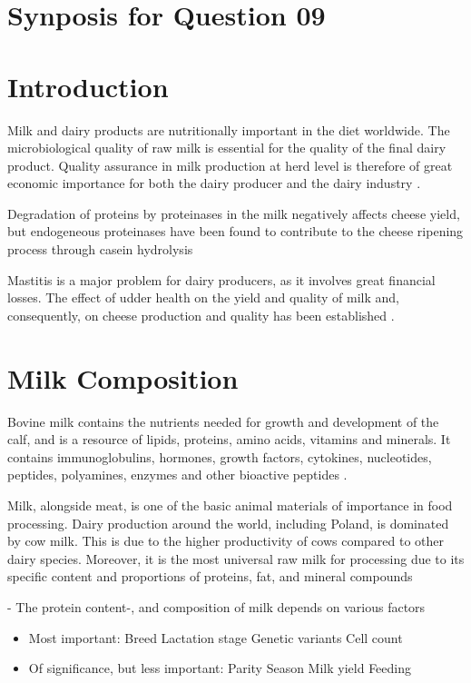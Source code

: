\setcounter{chapter}{2}
\setcounter{section}{0}
\section*{Synposis for Question 09}

\section{Introduction}
Milk and dairy products are nutritionally important in the diet worldwide. The microbiological quality of raw milk is essential for the quality of the final dairy product. Quality assurance in milk production at herd level is therefore of great economic importance for both the dairy producer and the dairy industry \cite*{a01_protein_degradation_in_bovine_milk}.

Degradation of proteins by proteinases in the milk negatively affects cheese yield, but endogeneous proteinases have been found to contribute to the cheese ripening process through casein hydrolysis \cite*{a02_proteases_and_protein_degradation}

Mastitis is a major problem for dairy producers, as it involves great financial losses. The effect of udder health on the yield and quality of milk and, consequently, on cheese production and quality has been established \cite*{a03_proteolysis_in_milk_during_mastitis}.


\section{Milk Composition}
Bovine milk contains the nutrients needed for growth and development of the calf, and is a resource of lipids, proteins, amino acids, vitamins and minerals. It contains immunoglobulins, hormones, growth factors, cytokines, nucleotides, peptides, polyamines, enzymes and other bioactive peptides \cite*{a04_bovine_milk_in_human_nutrition}. 

Milk, alongside meat, is one of the basic animal materials of importance in food processing. Dairy production around the world, including Poland, is dominated by cow milk. This is due to the higher productivity of cows compared to other dairy species. Moreover, it is the most universal raw milk for processing due to its specific content and proportions of proteins, fat, and mineral compounds \cite*{a05_organic_vs_conventional_milk}

- The protein content-, and composition of milk depends on various factors \cite*{s04_protein_fraction_in_milk}
\begin{itemize}
    \item Most important:
        \subitem Breed
        \subitem Lactation stage
        \subitem Genetic variants
        \subitem Cell count    

    \item Of significance, but less important:
            \subitem Parity
            \subitem Season
            \subitem Milk yield
            \subitem Feeding
\end{itemize}

